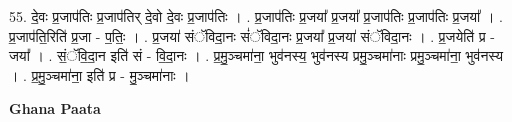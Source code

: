 \documentclass[17pt]{extarticle}
\begin{document}
55. दे॒वः प्र॒जाप॑तिः प्र॒जाप॑तिर् दे॒वो दे॒वः प्र॒जाप॑तिः । . प्र॒जाप॑तिः प्र॒जया᳚ प्र॒जया᳚ प्र॒जाप॑तिः प्र॒जाप॑तिः प्र॒जया᳚ । . प्र॒जाप॑ति॒रिति॑ प्र॒जा - प॒तिः॒ । . प्र॒जया॑ संॅविदा॒नः सं॑ॅविदा॒नः प्र॒जया᳚ प्र॒जया॑ संॅविदा॒नः । . प्र॒जयेति॑ प्र - जया᳚ । . सं॒ॅवि॒दा॒न इति॑ सं - वि॒दा॒नः । . प्र॒मु॒ञ्चमा॑ना॒ भुव॑नस्य॒ भुव॑नस्य प्रमु॒ञ्चमा॑नाः प्रमु॒ञ्चमा॑ना॒ भुव॑नस्य । . प्र॒मु॒ञ्चमा॑ना॒ इति॑ प्र - मु॒ञ्चमा॑नाः । \newline

\textbf{Ghana Paata } \newline
\end{document}
